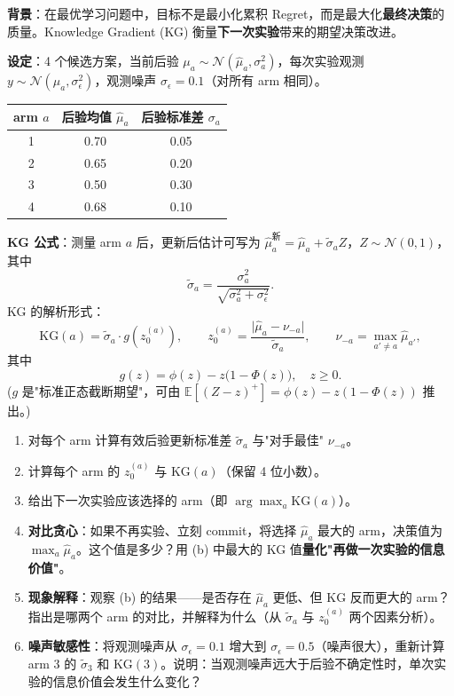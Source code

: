 \documentclass[12pt, a4paper]{ctexart}
\begin{document}
\begin{problem}
\textbf{背景}：在最优学习问题中，目标不是最小化累积 Regret，而是最大化\textbf{最终决策}的质量。Knowledge Gradient (KG) 衡量\textbf{下一次实验}带来的期望决策改进。

\medskip
\textbf{设定}：4 个候选方案，当前后验 $\mu_a \sim \mathcal{N}(\hat{\mu}_a, \sigma_a^2)$，每次实验观测 $y \sim \mathcal{N}(\mu_a, \sigma_\epsilon^2)$，观测噪声 $\sigma_\epsilon = 0.1$（对所有 arm 相同）。

\begin{center}
\begin{tabular}{c|c|c}
\toprule
arm $a$ & 后验均值 $\hat{\mu}_a$ & 后验标准差 $\sigma_a$ \\
\midrule
1 & 0.70 & 0.05 \\
2 & 0.65 & 0.20 \\
3 & 0.50 & 0.30 \\
4 & 0.68 & 0.10 \\
\bottomrule
\end{tabular}
\end{center}

\medskip
\textbf{KG 公式}：测量 arm $a$ 后，更新后估计可写为 $\hat{\mu}_a^{\text{新}} = \hat{\mu}_a + \tilde{\sigma}_a Z$，$Z \sim \mathcal{N}(0,1)$，其中
\[
\tilde{\sigma}_a = \frac{\sigma_a^2}{\sqrt{\sigma_a^2 + \sigma_\epsilon^2}}.
\]
KG 的解析形式：
\[
\mathrm{KG}(a) = \tilde{\sigma}_a \cdot g(z_0^{(a)}), \qquad
z_0^{(a)} = \frac{\big| \hat{\mu}_a - \nu_{-a} \big|}{\tilde{\sigma}_a}, \qquad
\nu_{-a} = \max_{a' \neq a} \hat{\mu}_{a'},
\]
其中
\[
g(z) = \phi(z) - z \big(1 - \Phi(z)\big), \quad z \geq 0.
\]
($g$ 是"标准正态截断期望"，可由 $\mathbb{E}[(Z - z)^+] = \phi(z) - z(1 - \Phi(z))$ 推出。)

\begin{enumerate}[label=(\alph*)]
    \item 对每个 arm 计算有效后验更新标准差 $\tilde{\sigma}_a$ 与"对手最佳" $\nu_{-a}$。

    \item 计算每个 arm 的 $z_0^{(a)}$ 与 $\mathrm{KG}(a)$（保留 4 位小数）。

    \item 给出下一次实验应该选择的 arm（即 $\arg\max_a \mathrm{KG}(a)$）。

    \item \textbf{对比贪心}：如果不再实验、立刻 commit，将选择 $\hat{\mu}_a$ 最大的 arm，决策值为 $\max_a \hat{\mu}_a$。这个值是多少？用 (b) 中最大的 KG 值\textbf{量化"再做一次实验的信息价值"}。

    \item \textbf{现象解释}：观察 (b) 的结果——是否存在 $\hat{\mu}_a$ 更低、但 $\mathrm{KG}$ 反而更大的 arm？指出是哪两个 arm 的对比，并解释为什么（从 $\tilde{\sigma}_a$ 与 $z_0^{(a)}$ 两个因素分析）。

    \item \textbf{噪声敏感性}：将观测噪声从 $\sigma_\epsilon = 0.1$ 增大到 $\sigma_\epsilon = 0.5$（噪声很大），重新计算 arm 3 的 $\tilde{\sigma}_3$ 和 $\mathrm{KG}(3)$。说明：当观测噪声远大于后验不确定性时，单次实验的信息价值会发生什么变化？
\end{enumerate}
\end{problem}
\end{document}
